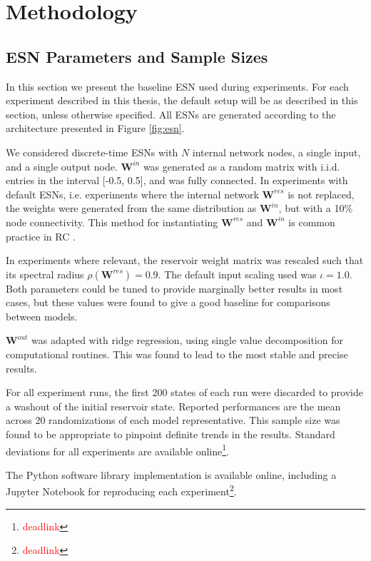 \chapter{Methodology}
\label{ch:method}

\section{ESN Parameters and Sample Sizes}
\label{sec:esn-param}

In this section we present the baseline ESN used during experiments. For each
experiment described in this thesis, the default setup will be as described in
this section, unless otherwise specified. All ESNs are generated according to
the architecture presented in Figure \ref{fig:esn}.

We considered discrete-time ESNs with $N$ internal network nodes, a single
input, and a single output node. $\mathbf{W}^{in}$ was generated as a random
matrix with i.i.d. entries in the interval [-0.5, 0.5], and was fully
connected. In experiments with default ESNs, i.e. experiments where the internal
network $\mathbf{W}^{res}$ is not replaced, the weights were generated from the
same distribution as $\mathbf{W}^{in}$, but with a 10\% node connectivity. This
method for instantiating $\mathbf{W}^{res}$ and $\mathbf{W}^{in}$ is common
practice in RC \cite{montavon_practical_2012}.

In experiments where relevant, the reservoir weight matrix was rescaled such
that its spectral radius $\rho(\mathbf{W}^{res}) = 0.9$. The default input
scaling used was $\iota = 1.0$. Both parameters could be tuned to provide
marginally better results in most cases, but these values were found to give a
good baseline for comparisons between models.

$\mathbf{W}^{out}$ was adapted with ridge regression, using single value
decomposition for computational routines. This was found to lead to the most
stable and precise results.

For all experiment runs, the first 200 states of each run were discarded to
provide a washout of the initial reservoir state. Reported performances are the
mean across 20 randomizations of each model representative. This sample size was
found to be appropriate to pinpoint definite trends in the results. Standard
deviations for all experiments are available
online\footnote{\textcolor{red}{deadlink}}.

The Python software library implementation is available online, including a
Jupyter Notebook for reproducing each
experiment\footnote{\textcolor{red}{deadlink}}.

